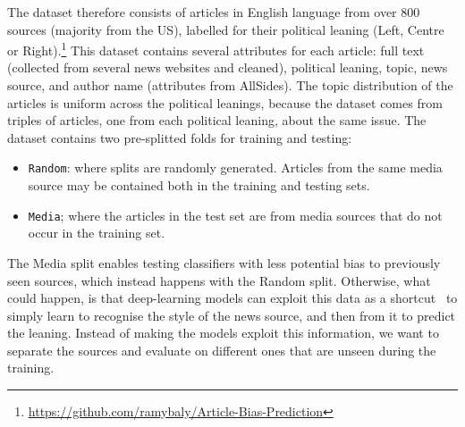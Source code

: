 The dataset therefore 
consists of articles in English language from over 800 sources (majority from the US), labelled for their political leaning (Left, Centre or Right).\footnote{\url{https://github.com/ramybaly/Article-Bias-Prediction}}
This dataset contains several attributes for each article: full text (collected from several news websites and cleaned), political leaning, topic, news source, and author name (attributes from AllSides).
The topic distribution of the articles is uniform across the political leanings, because the dataset comes from triples of articles, one from each political leaning, about the same issue. 
The dataset contains two pre-splitted folds for training and testing:
\begin{itemize}
    \item \texttt{Random}: where splits are randomly generated. Articles from the same media source may be contained both in the training and testing sets. 
    \item \texttt{Media}; where the articles in the test set are from media sources that do not occur in the training set. %
\end{itemize}

The Media split enables testing classifiers with less potential bias to previously seen sources, which instead happens with the Random split.
Otherwise, what could happen, is that deep-learning models can exploit this data as a shortcut~\citep{geirhos2020shortcut,baly2020we} to simply learn to recognise the style of the news source, and then from it to predict the leaning.
Instead of making the models exploit this information, we want to separate the sources and evaluate on different ones that are unseen during the training.

